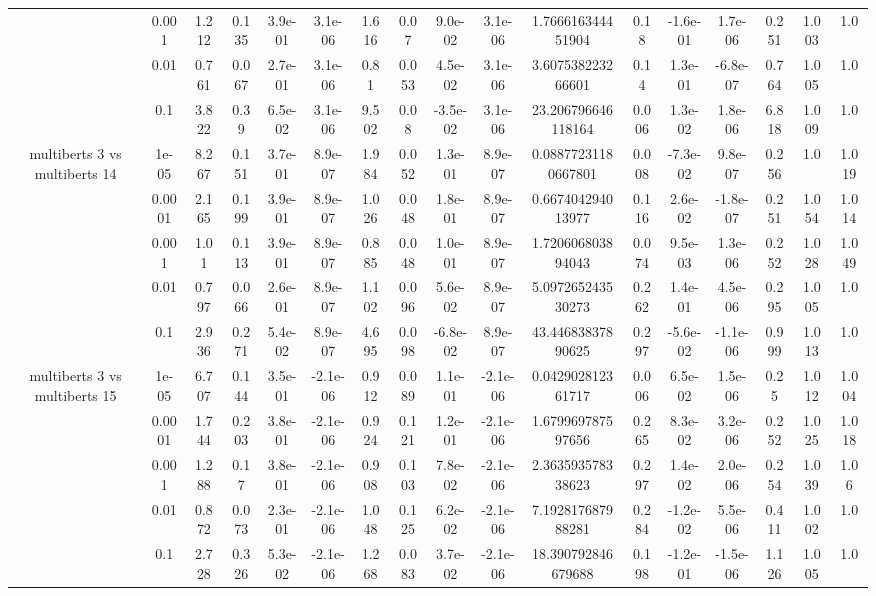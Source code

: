 \begin{tabular}{|c|c|c|c|c|c|c|c|c|c|c|c|c|c|c|c|c|}
 & 0.001 & 1.212 & 0.135 & 3.9e-01 & 3.1e-06 & 1.616 & 0.07 & 9.0e-02 & 3.1e-06 & 1.766616344451904 & 0.18 & -1.6e-01 & 1.7e-06 & 0.251 & 1.003 & 1.0 \\
 & 0.01 & 0.761 & 0.067 & 2.7e-01 & 3.1e-06 & 0.81 & 0.053 & 4.5e-02 & 3.1e-06 & 3.607538223266601 & 0.14 & 1.3e-01 & -6.8e-07 & 0.764 & 1.005 & 1.0 \\
 & 0.1 & 3.822 & 0.39 & 6.5e-02 & 3.1e-06 & 9.502 & 0.08 & -3.5e-02 & 3.1e-06 & 23.206796646118164 & 0.006 & 1.3e-02 & 1.8e-06 & 6.818 & 1.009 & 1.0 \\
\hline
\multirow{5}{*}{multiberts 3 vs multiberts 14} & 1e-05 & 8.267 & 0.151 & 3.7e-01 & 8.9e-07 & 1.984 & 0.052 & 1.3e-01 & 8.9e-07 & 0.08877231180667801 & 0.008 & -7.3e-02 & 9.8e-07 & 0.256 & 1.0 & 1.019 \\
 & 0.0001 & 2.165 & 0.199 & 3.9e-01 & 8.9e-07 & 1.026 & 0.048 & 1.8e-01 & 8.9e-07 & 0.667404294013977 & 0.116 & 2.6e-02 & -1.8e-07 & 0.251 & 1.054 & 1.014 \\
 & 0.001 & 1.01 & 0.113 & 3.9e-01 & 8.9e-07 & 0.885 & 0.048 & 1.0e-01 & 8.9e-07 & 1.720606803894043 & 0.074 & 9.5e-03 & 1.3e-06 & 0.252 & 1.028 & 1.049 \\
 & 0.01 & 0.797 & 0.066 & 2.6e-01 & 8.9e-07 & 1.102 & 0.096 & 5.6e-02 & 8.9e-07 & 5.097265243530273 & 0.262 & 1.4e-01 & 4.5e-06 & 0.295 & 1.005 & 1.0 \\
 & 0.1 & 2.936 & 0.271 & 5.4e-02 & 8.9e-07 & 4.695 & 0.098 & -6.8e-02 & 8.9e-07 & 43.44683837890625 & 0.297 & -5.6e-02 & -1.1e-06 & 0.999 & 1.013 & 1.0 \\
\hline
\multirow{5}{*}{multiberts 3 vs multiberts 15} & 1e-05 & 6.707 & 0.144 & 3.5e-01 & -2.1e-06 & 0.912 & 0.089 & 1.1e-01 & -2.1e-06 & 0.042902812361717 & 0.006 & 6.5e-02 & 1.5e-06 & 0.25 & 1.012 & 1.004 \\
 & 0.0001 & 1.744 & 0.203 & 3.8e-01 & -2.1e-06 & 0.924 & 0.121 & 1.2e-01 & -2.1e-06 & 1.679969787597656 & 0.265 & 8.3e-02 & 3.2e-06 & 0.252 & 1.025 & 1.018 \\
 & 0.001 & 1.288 & 0.17 & 3.8e-01 & -2.1e-06 & 0.908 & 0.103 & 7.8e-02 & -2.1e-06 & 2.363593578338623 & 0.297 & 1.4e-02 & 2.0e-06 & 0.254 & 1.039 & 1.06 \\
 & 0.01 & 0.872 & 0.073 & 2.3e-01 & -2.1e-06 & 1.048 & 0.125 & 6.2e-02 & -2.1e-06 & 7.192817687988281 & 0.284 & -1.2e-02 & 5.5e-06 & 0.411 & 1.002 & 1.0 \\
 & 0.1 & 2.728 & 0.326 & 5.3e-02 & -2.1e-06 & 1.268 & 0.083 & 3.7e-02 & -2.1e-06 & 18.390792846679688 & 0.198 & -1.2e-01 & -1.5e-06 & 1.126 & 1.005 & 1.0 \\

\end{tabular}
